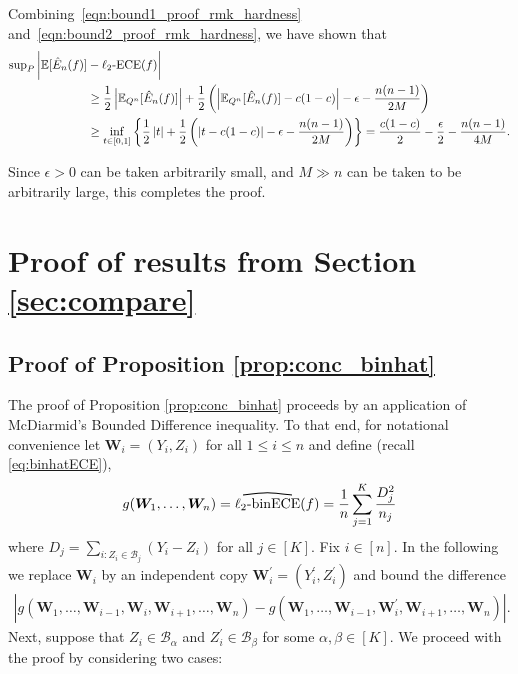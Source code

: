 \documentclass[11pt]{article}
\numberwithin{equation}{section}
\theoremstyle{definition}
\newcommand{\E}{\mathbb{E}}
\newcommand{\cB}{\mathcal{B}}
\newcommand{\bW}{\bm{W}}
\newcommand{\myoverline}[2][3.5em]{%
  \overset{%
    \tikz[baseline=-0.1ex]{
      \draw[line width=0.75pt]
        (0,0) .. controls (#1/2,0.5ex) .. (#1,0);
    }%
  }{#2}%
}
\newcommand{\ECE}{\mathrm{ECE}}
\newcommand{\lECE}{\ell_2\textnormal{-}\ECE}
\newcommand{\binECE}{\mathrm{binECE}}
\newcommand{\lbinECE}{\ell_2\textnormal{-}\binECE}
\newcommand{\binhatECE}{\myoverline{\lbinECE}}
\begin{document}
Combining~\eqref{eqn:bound1_proof_rmk_hardness} and~\eqref{eqn:bound2_proof_rmk_hardness}, we have shown that
\begin{align*}
    {\textstyle\sup_P} \,\bigg| \E[\hat{E}_n(f)] 
    & - \lECE(f)\bigg|\\
    & \geq \frac{1}{2}\left|\E_{Q^n}[\hat{E}_n(f)] \right|  + \frac{1}{2}\left(\left|\E_{Q^n}[\hat{E}_n(f)] - c(1-c)\right| - \epsilon - \frac{n(n-1)}{2M}\right)\\
    & \geq \inf_{t\in[0,1]} \left\{\frac{1}{2}\left|t \right|  + \frac{1}{2}\left(\left|t - c(1-c)\right| - \epsilon - \frac{n(n-1)}{2M}\right)\right\} = \frac{c(1-c)}{2} - \frac{\epsilon}{2} - \frac{n(n-1)}{4M}.
\end{align*}

Since $\epsilon>0$ can be taken arbitrarily small, and $M\gg n$ can be taken to be arbitrarily large, this completes the proof.


\section{Proof of results from Section \ref{sec:compare}}

\subsection{Proof of Proposition \ref{prop:conc_binhat}}\label{sec:proofof_conc_binhat}

The proof of Proposition \ref{prop:conc_binhat} proceeds by an application of McDiarmid's Bounded Difference inequality. To that end, for notational convenience let $\bW_i = (Y_i, Z_i)$ for all $1\leq i\leq n$ and define (recall \eqref{eq:binhatECE}),
\begin{align}\label{eq:def_g_binhat}
    g(\bW_1,\ldots, \bW_n) = \binhatECE(f) = \frac{1}{n}\sum_{j=1}^{K} \frac{D_j^2}{n_j}
\end{align}
where $D_j = \sum_{i:Z_i\in \cB_j}\left(Y_i - Z_i\right)$ for all $j\in [K]$. Fix $i\in [n]$. In the following we replace $\bW_i$ by an independent copy $\bW_i^\prime = (Y_i^\prime, Z_i^\prime)$ and bound the difference
\begin{align*}
    \left|g(\bW_1,\ldots, \bW_{i-1}, \bW_i,\bW_{i+1}, \ldots, \bW_n) - g(\bW_1,\ldots, \bW_{i-1}, \bW_i^\prime,\bW_{i+1}, \ldots, \bW_n)\right|.
\end{align*}
Next, suppose that $Z_i\in \cB_\alpha$ and $Z_i^\prime\in \cB_\beta$ for some $\alpha,\beta\in [K]$. We proceed with the proof by considering two cases:
\end{document}
